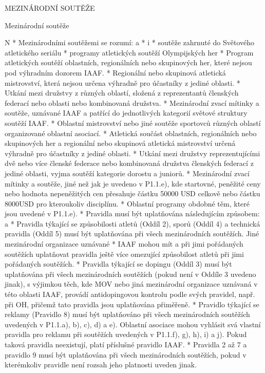 \chap MEZINÁRODNÍ SOUTĚŽE

\secc Mezinárodní soutěže

\begitems \style N
* Mezinárodními soutěžemi se rozumí:
  \begitems \style a
  *
    \begitems \style i
    * soutěže zahrnuté do Světového atletického seriálu
    * programy atletických soutěží Olympijských her
    \enditems
  * Program atletických soutěží oblastních, regionálních nebo skupinových her, které nejsou pod výhradním dozorem IAAF.
  * Regionální nebo skupinová atletická mistrovství, která nejsou určena výhradně pro účastníky z jediné oblasti.
  * Utkání mezi družstvy z různých oblastí, složená z reprezentantů členských federací nebo oblasti nebo kombinovaná družstva.
  * Mezinárodní zvací mítinky a soutěže, uznávané IAAF a patřící do jednotlivých kategorií světové struktury soutěží IAAF.
  * Oblastní mistrovství nebo jiné soutěže sportovců různých oblastí organizované oblastní asociací.
  * Atletická součást oblastních, regionálních nebo skupinových her a regionální nebo skupinová atletická mistrovství určená výhradně pro účastníky z jediné oblasti.
  * Utkání mezi družstvy reprezentujícími dvě nebo více členské federace nebo kombinovaná družstva členských federací z jediné oblasti, vyjma soutěží kategorie dorostu a juniorů.
  * Mezinárodní zvací mítinky a soutěže, jiné než jak je uvedeno v P1.1.e), kde startovné, peněžité ceny nebo hodnota nepeněžitých cen přesahuje částku 50000 USD celkově nebo částku 8000USD pro kteroukoliv disciplínu.
  * Oblastní programy obdobné těm, které jsou uvedené v P1.1.e).
  \enditems
* Pravidla musí být uplatňována následujícím způsobem:
  \begitems \style a
  * Pravidla týkající se způsobilosti atletů (Oddíl 2), sporů (Oddíl 4) a technická pravidla (Oddíl 5) musí být uplatňována při všech mezinárodních soutěžích. Jiné mezinárodní organizace uznávané
  * IAAF mohou mít a při jimi pořádaných soutěžích uplatňovat pravidla ještě více omezující způsobilost atletů při jimi pořádaných soutěžích.
  * Pravidla týkající se dopingu (Oddíl 3) musí být uplatňována při všech mezinárodních soutěžích (pokud není v Oddíle 3 uvedeno jinak), s výjimkou těch, kde MOV nebo jiná mezinárodní organizace uznávaná v této oblasti IAAF, provádí antidopingovou kontrolu podle svých pravidel, např. při OH, přičemž tato pravidla jsou uplatňována přiměřeně.
  * Pravidlo týkající se reklamy (Pravidlo 8) musí být uplatňováno při všech mezinárodních soutěžích uvedených v P1.1.a), b), c), d) a e). Oblastní asociace mohou vyhlásit svá vlastní pravidla pro reklamu při soutěžích uvedených v P1.1.f), g), h), i) a j). Pokud taková pravidla neexistují, platí příslušné pravidlo IAAF.
  * Pravidla 2 až 7 a pravidlo 9 musí být uplatňována při všech mezinárodních soutěžích, pokud v kterémkoliv pravidle není rozsah jeho platnosti uveden jinak.
  \enditems
\enditems

